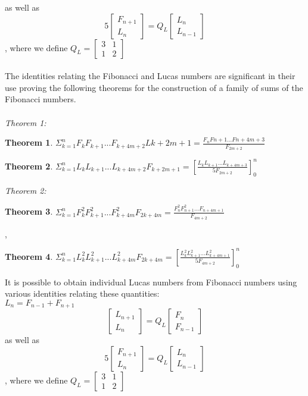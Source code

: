 \documentclass[11pt]{article}
\newtheorem{theorem}{Theorem}
\begin{document}
as well as \\
\[
5\begin{bmatrix}
F_{n+1} \\
L_{n}
\end{bmatrix} = Q_{L} \begin{bmatrix} L_{n} \\ L_{n-1}\end{bmatrix}
\] , where we define $Q_{L} = \begin{bmatrix} 3 & 1 \\ 1 & 2 \end{bmatrix}$
\\
\\
The identities relating the Fibonacci and Lucas numbers are significant in their use proving the following theorems for the construction of a family of sums of the Fibonacci numbers.\\ \\
\textit{Theorem 1:}  
\begin{theorem}
$\Sigma_{k=1}^{n} F_{k}F_{k+1}...F_{k+4m+2}L{k+2m+1} = \frac{F_{n}F{n+1}...F{n+4m+3}}{F_{2m+2}}$
\end{theorem} 

\begin{theorem}
$\Sigma_{k=1}^{n} L_{k}L_{k+1}...L_{k+4m+2}F_{k+2m+1}=[\frac{L_{k}L_{k+1}...L_{k+4m+3}}{5F_{2m+2}}]_{0}^n$
\end{theorem}

\textit{Theorem 2:}

\begin{theorem}
$\Sigma_{k=1}^n F_{k}^2F_{k+1}^2...F_{k+4m}^2F_{2k+4m}=\frac{F_{n}^2F_{n+1}^2...F_{n+4m+1}}{F_{4m+2}}$
\end{theorem},\\

\begin{theorem}
$\Sigma_{k=1}^n L_{k}^2L_{k+1}^2...L_{k+4m}^2F_{2k+4m}=[\frac{L_{k}^2L_{k+1}^2...L_{k+4m+1}^2}{5F_{4m+2}}]_{0}^n$
\end{theorem} It is possible to obtain individual Lucas numbers from Fibonacci numbers using various identities relating these quantities:\\$L_{n} = F_{n-1} + F_{n+1}$ \\ 
\[
\begin{bmatrix}
L_{n+1} \\
L_{n}
\end{bmatrix} = Q_{L} \begin{bmatrix} F_{n} \\ F_{n-1}\end{bmatrix}
\] 
as well as \\
\[
5\begin{bmatrix}
F_{n+1} \\
L_{n}
\end{bmatrix} = Q_{L} \begin{bmatrix} L_{n} \\ L_{n-1}\end{bmatrix}
\] , where we define $Q_{L} = \begin{bmatrix} 3 & 1 \\ 1 & 2 \end{bmatrix}$
\end{document}
